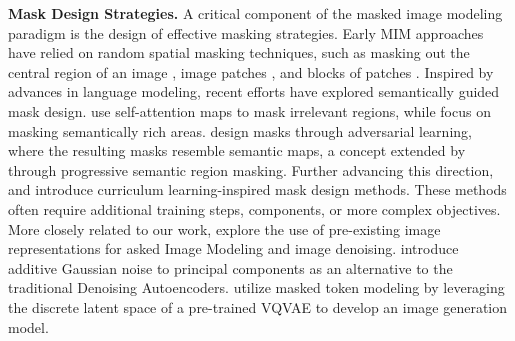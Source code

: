 \textbf{Mask Design Strategies.}  A critical component of the masked image modeling paradigm is the design of effective masking strategies. Early MIM approaches have relied on random spatial masking techniques, such as masking out the central region of an image \citep{pathak2016context}, image patches \citep{he_masked_2021,xie2022simmim}, and blocks of patches \citep{bao_beit_2022}. Inspired by advances in language modeling, recent efforts have explored semantically guided mask design. \citet{li_mst_2021} use self-attention maps to mask irrelevant regions, while \citet{kakogeorgiou_what_2022} focus on masking semantically rich areas. \citet{shi_adversarial_2022} design masks through adversarial learning, where the resulting masks resemble semantic maps, a concept extended by \citet{li_semmae_2022} through progressive semantic region masking. Further advancing this direction, \citet{wang_hard_2023} and \citet{madan_cl-mae_2024} introduce curriculum learning-inspired mask design methods. %
These methods often require additional training steps, components, or more complex objectives. More closely related to our work, \citet{chang2022maskgit, chen2024deconstructing} explore the use of pre-existing image representations for asked Image Modeling and image denoising. \citet{chen2024deconstructing} introduce additive Gaussian noise to principal components as an alternative to the traditional Denoising Autoencoders. \citet{chang2022maskgit} utilize masked token modeling by leveraging the discrete latent space of a pre-trained VQVAE to develop an image generation model.